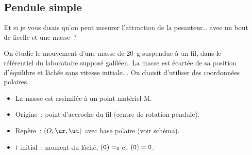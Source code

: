 \documentclass[../../main/main.tex]{subfiles}
\begin{document}
\subsection{Pendule simple}
Et si je vous disais qu'on peut mesurer l'attraction de la pesanteur… avec un
bout de ficelle et une masse~?
\bigbreak

\hspace*{-0.75cm}
\begin{minipage}{0.70\linewidth}
	\begin{enumerate}[label=\sqenumi]
		 On étudie le mouvement d'une masse de
		\SI{20}{g} suspendue à un fil, dans le référentiel du laboratoire
		supposé galiléen. La masse est écartée de sa position d'équilibre et
		lâchée sans vitesse initiale.
		.
		 On choisit d'utiliser des coordonnées polaires.
		\begin{itemize}
			\item La masse est assimilée à un point matériel M.
			\item Origine~: point d'accroche du fil (centre de rotation
			      pendule).
			\item Repère~: $(O,\ur,\ut)$ avec base polaire (voir schéma).
			\item $t$ initial~: moment du lâché, $\tt(0) = \tt_0$ et
			      $\tt(0) = 0$.
		\end{itemize}
	\end{enumerate}
\end{minipage}
\hfill
\end{document}
